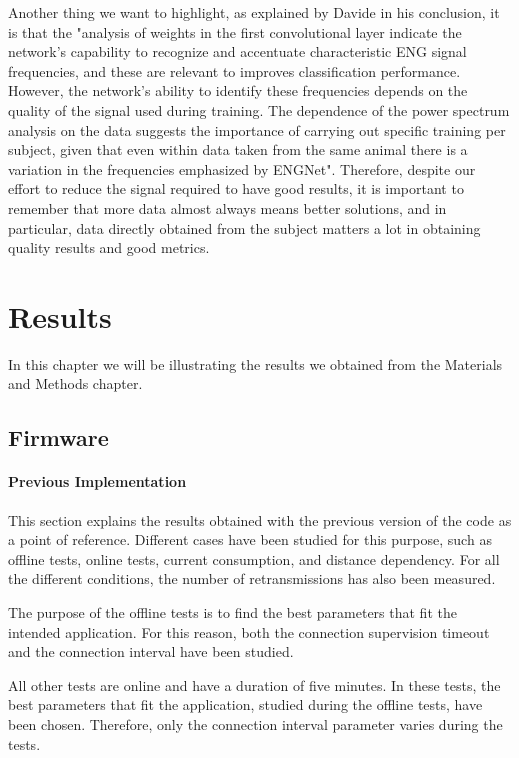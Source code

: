 \documentclass{Configuration_Files/PoliMi3i_thesis}
\begin{document}
Another thing we want to highlight, as explained by Davide in his conclusion, it is that the "analysis of weights in the first convolutional layer indicate the network’s capability to recognize and accentuate characteristic ENG signal frequencies, and these are relevant to improves classification performance. However, the network’s ability to identify these frequencies depends on the quality of the signal used during training. The dependence of the power spectrum analysis on the data suggests the importance of carrying out specific training per subject, given that even within data taken from the same animal there is a variation in the frequencies emphasized by ENGNet".
Therefore, despite our effort to reduce the signal required to have good results, it is important to remember that more data almost always means better solutions, and in particular, data directly obtained from the subject matters a lot in obtaining quality results and good metrics.


\chapter{Results}

In this chapter we will be illustrating the results we obtained from the Materials and Methods chapter.

\section{Firmware}


\subsubsection{Previous Implementation}

This section explains the results obtained with the previous version of the code as a point of reference. Different cases have been studied for this purpose, such as offline tests, online tests, current consumption, and distance dependency. For all the different conditions, the number of retransmissions has also been measured.

The purpose of the offline tests is to find the best parameters that fit the intended application. For this reason, both the connection supervision timeout and the connection interval have been studied.

All other tests are online and have a duration of five minutes. In these tests, the best parameters that fit the application, studied during the offline tests, have been chosen. Therefore, only the connection interval parameter varies during the tests.
\end{document}
